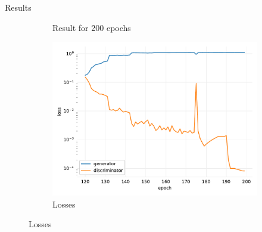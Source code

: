 \documentclass[12pt]{beamer}
\begin{document}
\begin{frame}{Results}
\begin{figure}[H]
\begin{subfigure}[b]{0.3\textwidth}
                \caption{Result for 200 epochs}
            \end{subfigure}
            \begin{subfigure}[b]{0.3\textwidth}
                \centering
                \includegraphics[width=\textwidth]{resources/cycle-gan/80.pdf}
                \caption{Losses}
            \end{subfigure}
            \hfill
        \end{figure}
    \end{frame}
    
\end{document}
